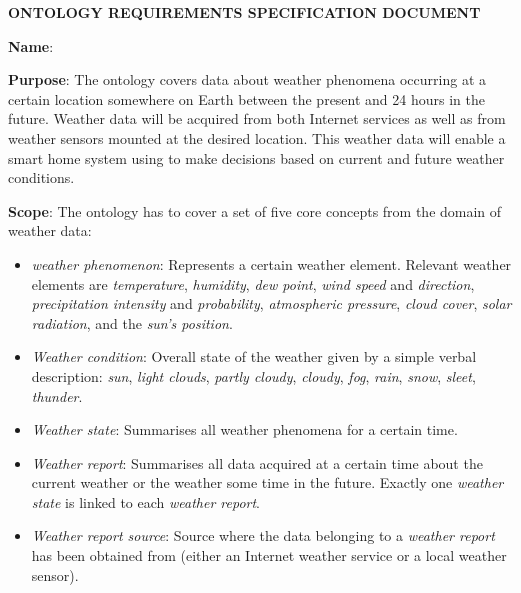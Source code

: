 \vspace{1em}

\begin{mdframed}[linewidth=.6pt]
\setlength{\parindent}{0pt}
\vspace{.4cm}

\MakeUppercase{\textbf{Ontology Requirements Specification Document}}

\vspace{.6cm}

\textbf{Name}: \smarthomeweather

\vspace{.3cm}

\textbf{Purpose}: The ontology covers data about weather phenomena occurring at a certain location somewhere on Earth between the present and 24 hours in the future. Weather data will be acquired from both Internet services as well as from weather sensors mounted at the desired location. This weather data will enable a smart home system using \smarthomeweather to make decisions based on current and future weather conditions.

\vspace{.3cm}

\textbf{Scope}: The ontology has to cover a set of five core concepts from the domain of weather data:

\begin{itemize}
  \item \emph{weather phenomenon}: Represents a certain weather element. Relevant weather elements are \emph{temperature}, \emph{humidity}, \emph{dew point}, \emph{wind speed} and \emph{direction}, \emph{precipitation intensity} and \emph{probability}, \emph{atmospheric pressure}, \emph{cloud cover}, \emph{solar radiation}, and the \emph{sun's position}.
  \item \emph{Weather condition}: Overall state of the weather given by a simple verbal description: \emph{sun}, \emph{light clouds}, \emph{partly cloudy}, \emph{cloudy}, \emph{fog}, \emph{rain}, \emph{snow}, \emph{sleet}, \emph{thunder}.
  \item \emph{Weather state}: Summarises all weather phenomena for a certain time. 
  \item \emph{Weather report}: Summarises all data acquired at a certain time about the current weather or the weather some time in the future. Exactly one \emph{weather state} is linked to each \emph{weather report}.
  \item \emph{Weather report source}: Source where the data belonging to a \emph{weather report} has been obtained from (either an Internet weather service or a local weather sensor).
\end{itemize}


\end{mdframed}
